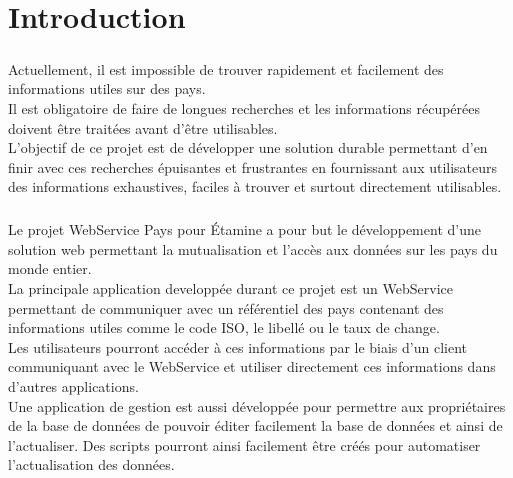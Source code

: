 \chapter{Introduction}
\paragraph{}
Actuellement, il est impossible de trouver rapidement et facilement des informations utiles sur des pays.\\
 Il est obligatoire de faire de longues recherches et les informations récupérées doivent être traitées avant d'être utilisables.\\
L'objectif de ce projet est de développer une solution durable permettant d'en finir avec ces recherches épuisantes et frustrantes en fournissant aux utilisateurs des informations exhaustives, faciles à trouver et surtout directement utilisables.\\
\paragraph{}
Le projet WebService Pays pour Étamine a pour but le développement d'une solution web permettant la mutualisation et l'accès aux données sur les pays du monde entier.\\
La principale application developpée durant ce projet est un WebService permettant de communiquer avec un référentiel des pays contenant des informations utiles comme le code ISO, le libellé ou le taux de change.\\
Les utilisateurs pourront accéder à ces informations par le biais d'un client communiquant avec le WebService et utiliser directement ces informations dans d'autres applications.\\
Une application de gestion est aussi développée pour permettre aux propriétaires de la base de données de pouvoir éditer facilement la base de données et ainsi de l'actualiser. Des scripts pourront ainsi facilement être créés pour automatiser l'actualisation des données.
